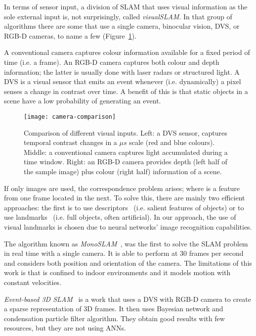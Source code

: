 In terms of sensor input, a division of SLAM that uses visual information as the sole external input is, not surprisingly, called \emph{visualSLAM}. In that group of algorithms  there are some that use a single camera, binocular vision, DVS, or RGB-D cameras, to name a few (Figure~\ref{fig:slam:camera-comparison}). 

A conventional camera captures colour information available for a fixed period of time (i.e. a frame). An RGB-D camera captures both colour and depth information; the latter is usually done with laser radars or structured light. A DVS is a visual sensor that emits an event whenever (i.e. dynamically) a pixel senses a change in contrast over time. A benefit of this is that static objects in a scene have a low probability of generating an event.

\begin{figure}[h]
  \begin{center}
    \texttt{[image: camera-comparison]}
    \caption{Comparison of different visual inputs. Left: a DVS sensor, captures temporal contrast changes in a $\mu s$ scale (red and blue colours). Middle: a conventional camera captures light accumulated during a time window. Right: an RGB-D camera provides depth (left half of the sample image) plus colour (right half) information of a scene.}
    \label{fig:slam:camera-comparison}
  \end{center}
\end{figure}


If only images are used, the correspondence problem arises; where is a feature from one frame located in the next. To solve this, there are mainly two efficient approaches: the first is to use descriptors~\cite{lowe1999object,bay2006surf,alahi2012freak} (i.e. salient features of objects) or to use landmarks~\cite{sola2012impact,frintrop2006attentional} (i.e. full objects, often artificial). In our approach, the use of visual landmarks is chosen due to neural networks' image recognition capabilities. 

The algorithm known as \emph{MonoSLAM}~\cite{davison2007monoslam}, was the first to solve the SLAM problem in real time with a single camera. It is able to perform at 30 frames per second and considers both position and orientation of the camera. The limitations of this work is that is confined to indoor environments and it models motion with constant velocities.

\emph{Event-based 3D SLAM}~\cite{Weikersdorfer2014} is a work that uses a DVS  with RGB-D camera to create a sparse representation of 3D frames. It then uses Bayesian network and condensation particle filter algorithm. They obtain good results with few resources, but they are not using ANNs.

